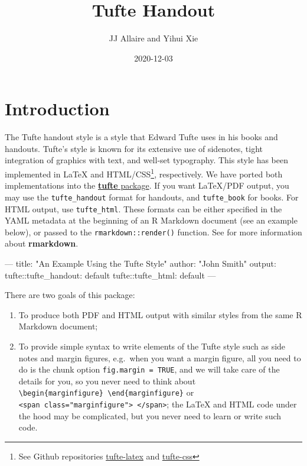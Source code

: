 \documentclass[]{tufte-book}
\title{Tufte Handout}
\author{JJ Allaire and Yihui Xie}
\date{2020-12-03}
\newenvironment{Shaded}{}{}
\newcommand{\AttributeTok}[1]{\textcolor[rgb]{0.49,0.56,0.16}{#1}}
\newcommand{\FunctionTok}[1]{\textcolor[rgb]{0.02,0.16,0.49}{#1}}
\newcommand{\OtherTok}[1]{\textcolor[rgb]{0.00,0.44,0.13}{#1}}
\newcommand{\StringTok}[1]{\textcolor[rgb]{0.25,0.44,0.63}{#1}}
\providecommand{\tightlist}{%
  \setlength{\itemsep}{0pt}\setlength{\parskip}{0pt}}
\begin{document}
\maketitle




\hypertarget{introduction}{%
\chapter{Introduction}\label{introduction}}

The Tufte handout style is a style that Edward Tufte uses in his books
and handouts. Tufte's style is known for its extensive use of sidenotes,
tight integration of graphics with text, and well-set typography. This
style has been implemented in LaTeX and HTML/CSS\footnote{See Github
  repositories
  \href{https://github.com/tufte-latex/tufte-latex}{tufte-latex} and
  \href{https://github.com/edwardtufte/tufte-css}{tufte-css}},
respectively. We have ported both implementations into the
\href{https://github.com/rstudio/tufte}{\textbf{tufte} package}. If you
want LaTeX/PDF output, you may use the \texttt{tufte\_handout} format
for handouts, and \texttt{tufte\_book} for books. For HTML output, use
\texttt{tufte\_html}. These formats can be either specified in the YAML
metadata at the beginning of an R Markdown document (see an example
below), or passed to the \texttt{rmarkdown::render()} function. See
\citet{R-rmarkdown} for more information about \textbf{rmarkdown}.

\begin{Shaded}
\begin{Highlighting}[]
\OtherTok{---}
\FunctionTok{title:}\AttributeTok{ }\StringTok{"An Example Using the Tufte Style"}
\FunctionTok{author:}\AttributeTok{ }\StringTok{"John Smith"}
\FunctionTok{output:}
  \FunctionTok{tufte:}\AttributeTok{:tufte_handout: default}
  \FunctionTok{tufte:}\AttributeTok{:tufte_html: default}
\OtherTok{---}
\end{Highlighting}
\end{Shaded}

There are two goals of this package:

\begin{enumerate}
\def\labelenumi{\arabic{enumi}.}
\tightlist
\item
  To produce both PDF and HTML output with similar styles from the same
  R Markdown document;
\item
  To provide simple syntax to write elements of the Tufte style such as
  side notes and margin figures, e.g.~when you want a margin figure, all
  you need to do is the chunk option \texttt{fig.margin\ =\ TRUE}, and
  we will take care of the details for you, so you never need to think
  about
  \texttt{\textbackslash{}begin\{marginfigure\}\ \textbackslash{}end\{marginfigure\}}
  or
  \texttt{\textless{}span\ class="marginfigure"\textgreater{}\ \textless{}/span\textgreater{}};
  the LaTeX and HTML code under the hood may be complicated, but you
  never need to learn or write such code.
\end{enumerate}
\end{document}
